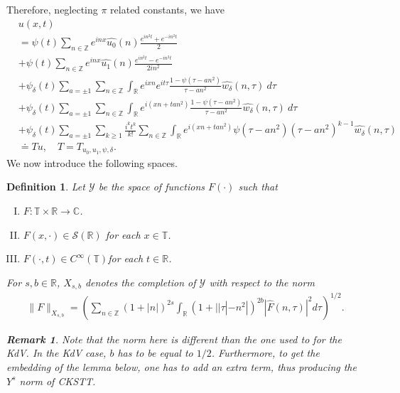 \documentclass[12pt,reqno]{amsart}
\numberwithin{equation}{section}  %
\newcommand{\rr}{\mathbb{R}}
\newcommand{\zz}{\mathbb{Z}}
\newcommand{\cc}{\mathbb{C}}
\newcommand{\ci}{\mathbb{T}}
\newcommand{\wh}{\widehat}
\newtheorem{definition}[theorem]{Definition}
\newtheorem{remark}[theorem]{Remark}
\begin{document}
%
%
Therefore, neglecting $\pi$ related constants, we have
%
%
%
\begin{align}
  & u(x,t)
  \label{main1-rel-term-0}
  \\
  \label{main1-rel-term-1}
  & = \psi(t) \sum_{n \in \zz} e^{inx} \wh{u_{0}}(n) \frac{e^{in^{2}t} + e^{-in^{2}t}}{2} 
  \\
  \label{main1-rel-term-2}
  & + \psi(t) \sum_{n \in \zz} e^{inx}
  \wh{u_{1}}(n)\frac{e^{in^{2}t} - e^{-in^{2}t}}{2 i n^{2}} 
  \\
  \label{main1-rel-term-3}
  & +  \psi_{\delta}(t)\sum_{a = \pm 1} \sum_{n\in \zz} \int_\rr e^{ixn}  
  e^{it \tau} \frac{1 - \psi(\tau -  an^{2}) 
}{\tau -  an^{2}} \wh{w_{\delta}}(n, \tau) \ d \tau
  \\
  \label{main1-rel-term-4}
  & + \psi_{\delta}(t) \sum_{a = \pm 1} \sum_{n\in \zz} \int_\rr e^{i(xn + 
  t an^{2})}
  \frac{1- \psi(\tau -  an^{2})}{\tau -  an^{2}} \wh{w_{\delta}}(n, \tau) \ d \tau
  \\
  \label{main1-rel-term-4.5}
  & +  \psi_{\delta}(t) \sum_{a = \pm 1}  \sum_{k \ge 1} \frac{i^k t^k}{k!}
  \sum_{n \in \zz} \int_\rr e^{i(xn + t an^{2} )}
  \psi(\tau -  an^{2}) (\tau -  an^{2})^{k-1} \wh{w_{\delta}}(n, \tau)
  \\
  \label{main1-rel-term-5}
  & \doteq Tu, \quad T=T_{u_0, u_1, \psi, \delta}.
\end{align}
%
%
%
%
%
%
%
%
%
%
%
%
We now introduce the following spaces. 
%
%
\begin{definition}
  Let $\mathcal{Y}$ be the space of functions $F(\cdot)$ such that
  \begin{enumerate}[(I)]
   \item{$F: \ci \times \rr \to \cc$}.
   \item{$F(x, \cdot) \in \mathcal{S}(\rr)$ for each $x \in \ci$}.
   \item{$F(\cdot, t) \in C^{\infty}(\ci)$for each $t \in \rr$}.
  \end{enumerate}
  For $s, b \in \rr$, $X_{s,b}$ denotes the completion of $\mathcal{Y}$ with
  respect to the norm
  \begin{equation}
  \begin{split}
    \|F\|_{X_{s,b}} = \left( \sum_{n \in \zz} (1 + |n|)^{2s} \int_{\rr}
    (1 + | | \tau | - n^{2} |)^{2b} |\wh{F}(n, \tau)|^{2} d \tau\right)^{1/2}.
  \end{split}
  \label{eqn:bous-norm}
  \end{equation}
  \begin{framed}
    \begin{remark}
    Note that the norm here is different than the one used to for the KdV. In
    the KdV case, $b$ has to be equal to $1/2$. Furthermore, to get the embedding
    of the lemma below, one has to add an extra term, thus producing the
    $Y^{s}$ norm of CKSTT\@.
    \label{rem:alternate-space}
    \end{remark}
  \end{framed}
\end{definition}
\end{document}
